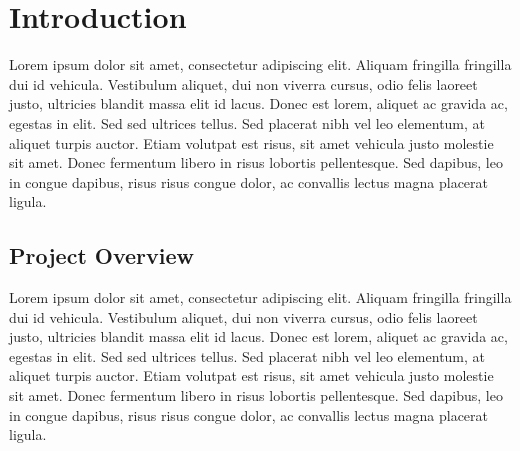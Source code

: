 \section{Introduction}
Lorem ipsum dolor sit amet, consectetur adipiscing elit. Aliquam fringilla fringilla dui id vehicula. Vestibulum aliquet, dui non viverra cursus, odio felis laoreet justo, ultricies blandit massa elit id lacus. Donec est lorem, aliquet ac gravida ac, egestas in elit. Sed sed ultrices tellus. Sed placerat nibh vel leo elementum, at aliquet turpis auctor. Etiam volutpat est risus, sit amet vehicula justo molestie sit amet. Donec fermentum libero in risus lobortis pellentesque. Sed dapibus, leo in congue dapibus, risus risus congue dolor, ac convallis lectus magna placerat ligula.
\subsection{Project Overview}
Lorem ipsum dolor sit amet, consectetur adipiscing elit. Aliquam fringilla fringilla dui id vehicula. Vestibulum aliquet, dui non viverra cursus, odio felis laoreet justo, ultricies blandit massa elit id lacus. Donec est lorem, aliquet ac gravida ac, egestas in elit. Sed sed ultrices tellus. Sed placerat nibh vel leo elementum, at aliquet turpis auctor. Etiam volutpat est risus, sit amet vehicula justo molestie sit amet. Donec fermentum libero in risus lobortis pellentesque. Sed dapibus, leo in congue dapibus, risus risus congue dolor, ac convallis lectus magna placerat ligula.